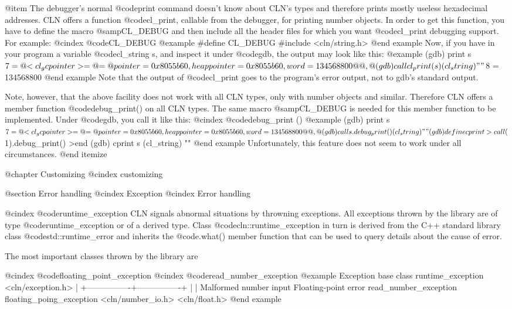 @item The debugger's normal @code{print} command doesn't know about
CLN's types and therefore prints mostly useless hexadecimal addresses.
CLN offers a function @code{cl_print}, callable from the debugger,
for printing number objects. In order to get this function, you have
to define the macro @samp{CL_DEBUG} and then include all the header files
for which you want @code{cl_print} debugging support. For example:
@cindex @code{CL_DEBUG}
@example
#define CL_DEBUG
#include <cln/string.h>
@end example
Now, if you have in your program a variable @code{cl_string s}, and
inspect it under @code{gdb}, the output may look like this:
@example
(gdb) print s
$7 = @{<cl_gcpointer> = @{ = @{pointer = 0x8055b60, heappointer = 0x8055b60,
  word = 134568800@}@}, @}
(gdb) call cl_print(s)
(cl_string) ""
$8 = 134568800
@end example
Note that the output of @code{cl_print} goes to the program's error output,
not to gdb's standard output.

Note, however, that the above facility does not work with all CLN types,
only with number objects and similar. Therefore CLN offers a member function
@code{debug_print()} on all CLN types. The same macro @samp{CL_DEBUG}
is needed for this member function to be implemented. Under @code{gdb},
you call it like this:
@cindex @code{debug_print ()}
@example
(gdb) print s
$7 = @{<cl_gcpointer> = @{ = @{pointer = 0x8055b60, heappointer = 0x8055b60,
  word = 134568800@}@}, @}
(gdb) call s.debug_print()
(cl_string) ""
(gdb) define cprint
>call ($1).debug_print()
>end
(gdb) cprint s
(cl_string) ""
@end example
Unfortunately, this feature does not seem to work under all circumstances.
@end itemize


@chapter Customizing
@cindex customizing

@section Error handling
@cindex Exception
@cindex Error handling

@cindex @code{runtime_exception}
CLN signals abnormal situations by throwning exceptions. All exceptions
thrown by the library are of type @code{runtime_exception} or of a
derived type. Class @code{cln::runtime_exception} in turn is derived
from the C++ standard library class @code{std::runtime_error} and
inherits the @code{.what()} member function that can be used to query
details about the cause of error.

The most important classes thrown by the library are

@cindex @code{floating_point_exception}
@cindex @code{read_number_exception}
@example
                  Exception base class
                    runtime_exception
                    <cln/exception.h>
                            | 
           +----------------+----------------+
           |                                 |
 Malformed number input             Floating-point error
 read_number_exception            floating_poing_exception
   <cln/number_io.h>                   <cln/float.h>
@end example

